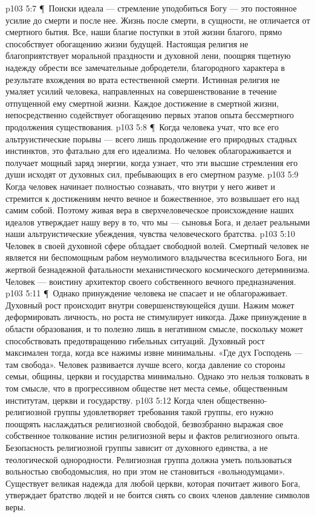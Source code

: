 \vs p103 5:7 \P\ Поиски идеала --- стремление уподобиться Богу --- это постоянное усилие до смерти и после нее. Жизнь после смерти, в сущности, не отличается от смертного бытия. Все, наши благие поступки в этой жизни благого, прямо способствует обогащению жизни будущей. Настоящая религия не благоприятствует моральной праздности и духовной лени, поощряя тщетную надежду обрести все замечательные добродетели, благородного характера в результате вхождения во врата естественной смерти. Истинная религия не умаляет усилий человека, направленных на совершенствование в течение отпущенной ему смертной жизни. Каждое достижение в смертной жизни, непосредственно содействует обогащению первых этапов опыта бессмертного продолжения существования.
\vs p103 5:8 \P\ Когда человека учат, что все его альтруистические порывы --- всего лишь продолжение его природных стадных инстинктов, это фатально для его идеализма. Но человек облагораживается и получает мощный заряд энергии, когда узнает, что эти высшие стремления его души исходят от духовных сил, пребывающих в его смертном разуме.
\vs p103 5:9 Когда человек начинает полностью сознавать, что внутри у него живет и стремится к достижениям нечто вечное и божественное, это возвышает его над самим собой. Поэтому живая вера в сверхчеловеческое происхождение наших идеалов утверждает нашу веру в то, что мы --- сыновья Бога, и делает реальными наши альтруистические убеждения, чувства человеческого братства.
\vs p103 5:10 Человек в своей духовной сфере обладает свободной волей. Смертный человек не является ни беспомощным рабом неумолимого владычества всесильного Бога, ни жертвой безнадежной фатальности механистического космического детерминизма. Человек --- воистину архитектор своего собственного вечного предназначения.
\vs p103 5:11 \P\ Однако принуждение человека не спасает и не облагораживает. Духовный рост происходит внутри совершенствующейся души. Нажим может деформировать личность, но роста не стимулирует никогда. Даже принуждение в области образования, и то полезно лишь в негативном смысле, поскольку может способствовать предотвращению гибельных ситуаций. Духовный рост максимален тогда, когда все нажимы извне минимальны. «Где дух Господень --- там свобода». Человек развивается лучше всего, когда давление со стороны семьи, общины, церкви и государства минимально. Однако это нельзя толковать в том смысле, что в прогрессивном обществе нет места семье, общественным институтам, церкви и государству.
\vs p103 5:12 Когда член общественно\hyp{}религиозной группы удовлетворяет требования такой группы, его нужно поощрять наслаждаться религиозной свободой, безвозбранно выражая свое собственное толкование истин религиозной веры и фактов религиозного опыта. Безопасность религиозной группы зависит от духовного единства, а не теологической однородности. Религиозная группа должна уметь пользоваться вольностью свободомыслия, но при этом не становиться «вольнодумцами». Существует великая надежда для любой церкви, которая почитает живого Бога, утверждает братство людей и не боится снять со своих членов давление символов веры.
